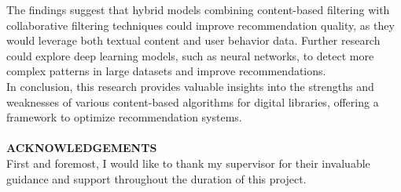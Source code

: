 \documentclass[10pt, oneside,english,hidelinks,a4paper]{article}
\begin{document}
\begin{multicols}{2}
The findings suggest that hybrid models combining content-based filtering with collaborative filtering techniques could improve recommendation quality, as they would leverage both textual content and user behavior data. Further research could explore deep learning models, such as neural networks, to detect more complex patterns in large datasets and improve recommendations.\\
In conclusion, this research provides valuable insights into the strengths and weaknesses of various content-based algorithms for digital libraries, offering a framework to optimize recommendation systems. \\\\
%
%
\noindent
\textbf{ACKNOWLEDGEMENTS}\\
First and foremost, I would like to thank my supervisor for their invaluable guidance and support throughout the duration of this project.\\


\clearpage 
 
 
\end{multicols}
\end{document}
